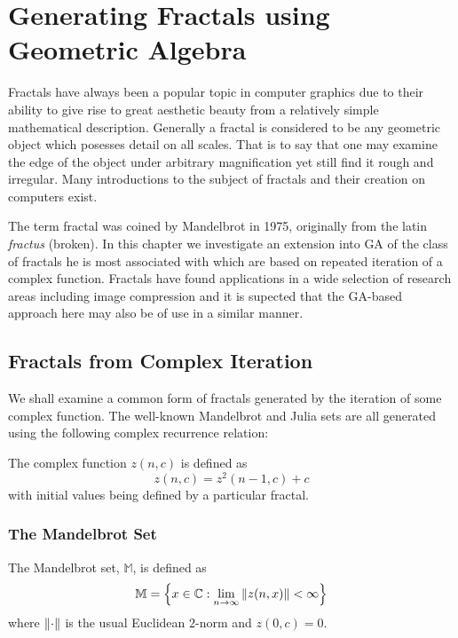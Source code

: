 \chapter{Generating Fractals using Geometric Algebra}

Fractals have always been a popular topic in computer graphics due
to their ability to give rise to great aesthetic beauty from a relatively
simple mathematical description. Generally a fractal is considered to be
any geometric object which posesses detail on all scales\cite{FRAC:FractalsEverywhere,
  FRAC:FractalGeometryOfNature}. That is to say
that one may examine the edge of the object under arbitrary magnification
yet still find it rough and irregular. Many introductions to the 
subject of fractals and their creation on computers exist\cite{FRAC:FractalGeometry, FRAC:ChaosAndFractals, FRAC:FractalImages}.

The term fractal was coined by Mandelbrot\cite{FRAC:LesObjetsFractals} in 1975,
originally from the latin {\em fractus} (broken). In this chapter we
investigate an extension into GA of the class of fractals he is most 
associated with which are based on repeated iteration of a complex function.
Fractals have found applications in a wide selection of research areas
including image compression\cite{FRAC:ImageCompression} and it is supected that the 
GA-based approach here may also be of use in a similar manner.

\section{Fractals from Complex Iteration}

We shall examine a common form of fractals generated by the iteration
of some complex function. The well-known 
Mandelbrot
and Julia sets\cite{FRAC:Mandelbrot, FRAC:JuliaMandelBook} are all
generated using the following complex recurrence relation:
\begin{definition}
The complex function $z(n,c)$ is defined as
\[
z(n,c) = z^2(n-1,c) + c
\]
with initial values being defined by a particular fractal.
\end{definition}

\subsection{The Mandelbrot Set}

\begin{definition}
The Mandelbrot set, $\mathbb{M}$, is defined as
\[
\mathbb{M} = 
\left\{x \in \mathbb{C} 
: \lim_{n \rightarrow \infty} \left\Vert z(n,x) \right\Vert < \infty \right\} 
\]
where $\left\Vert \cdot \right\Vert$ is the usual Euclidean $2$-norm and $z(0,c) = 0$.
\end{definition}

